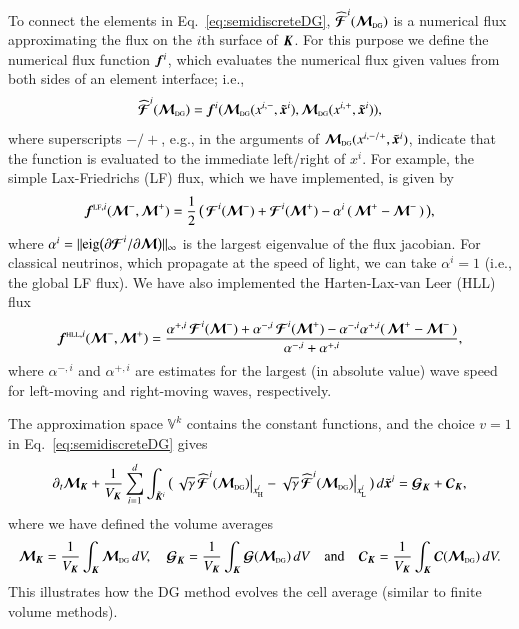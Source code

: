 \documentclass[11pt,letterpaper,twoside,english,final]{article}
\newcommand{\sumx}{\sum_{i=1}^{d}}
\begin{document}
To connect the elements in Eq.~\eqref{eq:semidiscreteDG}, $\widehat{\boldsymbol{\mathcal{F}}}^{i}(\boldsymbol{\mathcal{M}}_{\mbox{\tiny DG}})$ is a numerical flux approximating the flux on the $i$th surface of $\boldsymbol{K}$.  
For this purpose we define the numerical flux function $\boldsymbol{f}^{i}$, which evaluates the numerical flux given values from both sides of an element interface; i.e.,
\begin{equation}
  \widehat{\boldsymbol{\mathcal{F}}}^{i}(\boldsymbol{\mathcal{M}}_{\mbox{\tiny DG}})=\boldsymbol{f}^{i}(\boldsymbol{\mathcal{M}}_{\mbox{\tiny DG}}(x^{i,-},\tilde{\boldsymbol{x}}^{i}),\boldsymbol{\mathcal{M}}_{\mbox{\tiny DG}}(x^{i,+},\tilde{\boldsymbol{x}}^{i})),
\end{equation}
where superscripts $-/+$, e.g., in the arguments of $\boldsymbol{\mathcal{M}}_{\mbox{\tiny DG}}(x^{i,-/+},\tilde{\boldsymbol{x}}^{i})$, indicate that the function is evaluated to the immediate left/right of $x^{i}$.  
For example, the simple Lax-Friedrichs (LF) flux, which we have implemented, is given by
\begin{equation}
  \boldsymbol{f}^{\mbox{\tiny LF},i}(\boldsymbol{\mathcal{M}}^{-},\boldsymbol{\mathcal{M}}^{+})
  =\frac{1}{2}\,\big(\,\boldsymbol{\mathcal{F}}^{i}(\boldsymbol{\mathcal{M}}^{-})+\boldsymbol{\mathcal{F}}^{i}(\boldsymbol{\mathcal{M}}^{+})-\alpha^{i}\,(\,\boldsymbol{\mathcal{M}}^{+}-\boldsymbol{\mathcal{M}}^{-}\,)\,\big),
\end{equation}
where $\alpha^{i}=||\mbox{eig}\big(\partial\boldsymbol{\mathcal{F}}^{i}/\partial\boldsymbol{\mathcal{M}}\big)||_{\infty}$ is the largest eigenvalue of the flux jacobian.  
For classical neutrinos, which propagate at the speed of light, we can take $\alpha^{i}=1$ (i.e., the global LF flux).  
We have also implemented the Harten-Lax-van Leer (HLL) flux \citep{harten_etal_1983}
\begin{equation}
  \boldsymbol{f}^{\mbox{\tiny HLL},i}(\boldsymbol{\mathcal{M}}^{-},\boldsymbol{\mathcal{M}}^{+})
  =\frac{\alpha^{+,i}\,\boldsymbol{\mathcal{F}}^{i}(\boldsymbol{\mathcal{M}}^{-})+\alpha^{-,i}\,\boldsymbol{\mathcal{F}}^{i}(\boldsymbol{\mathcal{M}}^{+})-\alpha^{-,i}\alpha^{+,i}(\,\boldsymbol{\mathcal{M}}^{+}-\boldsymbol{\mathcal{M}}^{-}\,)}{\alpha^{-,i}+\alpha^{+,i}},
\end{equation}
where $\alpha^{-,i}$ and $\alpha^{+,i}$ are estimates for the largest (in absolute value) wave speed for left-moving and right-moving waves, respectively.  

The approximation space $\mathbb{V}^{k}$ contains the constant functions, and the choice $v=1$ in Eq.~\eqref{eq:semidiscreteDG} gives
\begin{equation}
  \partial_{t}\bcM_{\bK}
  +\f{1}{V_{\bK}}\sumx\int_{\tilde{\bK}^{i}}
  \big(\,\sqrt{\gamma}\,\widehat{\bcF}^{i}(\bcM_{\DG})\big|_{\xH^{i}}-\sqrt{\gamma}\,\widehat{\bcF}^{i}(\bcM_{\DG})\big|_{\xL^{i}}\,\big)\,d\tilde{\bx}^{i}
  =\bcG_{\bK}+\bcC_{\bK},
\end{equation}
where we have defined the volume averages
\begin{equation}
  \boldsymbol{\mathcal{M}}_{\boldsymbol{K}}=\frac{1}{V_{\boldsymbol{K}}}\int_{\boldsymbol{K}}\boldsymbol{\mathcal{M}}_{\mbox{\tiny DG}}\,dV, \quad
  \boldsymbol{\mathcal{G}}_{\boldsymbol{K}}=\frac{1}{V_{\boldsymbol{K}}}\int_{\boldsymbol{K}}\boldsymbol{\mathcal{G}}(\boldsymbol{\mathcal{M}}_{\mbox{\tiny DG}})\,dV  \quad\text{and}\quad
  \boldsymbol{\mathcal{C}}_{\boldsymbol{K}}=\frac{1}{V_{\boldsymbol{K}}}\int_{\boldsymbol{K}}\boldsymbol{\mathcal{C}}(\boldsymbol{\mathcal{M}}_{\mbox{\tiny DG}})\,dV.
\end{equation}
This illustrates how the DG method evolves the cell average (similar to finite volume methods).  
\end{document}
